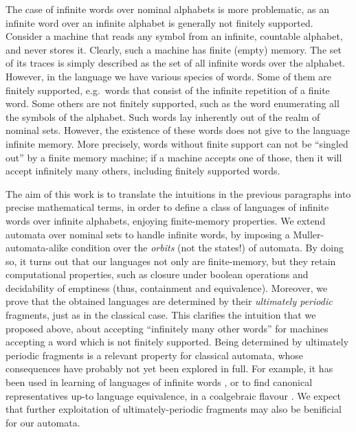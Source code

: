 The case of infinite words over nominal alphabets is more problematic, as an infinite word over an infinite alphabet is generally not finitely supported. Consider a machine that reads any symbol from an infinite, countable alphabet, and never stores it. Clearly, such a machine has finite (empty) memory. The set of its traces is simply described as the set of all infinite words over the alphabet. However, in the language we have various species of words. Some of them are finitely supported, e.g.\ words that consist of the infinite repetition of a finite word. Some others are not finitely supported, such as the word enumerating all the symbols of the alphabet. Such words lay inherently out of the realm of nominal sets. However, the existence of these words does not give to the language infinite memory. More precisely,  words without finite support can not be ``singled out'' by a finite memory machine; if a machine accepts one of those, then it will accept infinitely many others, including finitely supported words.  

The aim of this work is to translate the intuitions in the previous paragraphs into precise mathematical terms, in order to define a class of languages of infinite words over infinite alphabets, enjoying finite-memory properties. We extend automata over nominal sets to handle infinite words, by imposing a Muller-automata-alike condition 
%
%
over the \emph{orbits} (not the states!) of automata. By doing so, it turns out that our languages not only are finite-memory, but they retain computational properties, such as closure under boolean operations and decidability of emptiness (thus, containment and equivalence). Moreover, we prove that the obtained languages are determined by their \emph{ultimately periodic} fragments, just as in the classical case. This clarifies the intuition that we proposed above, about accepting ``infinitely many other words'' for machines accepting a word which is not finitely supported. 
%
Being determined by ultimately periodic fragments is
a relevant property for classical automata, whose consequences  have probably not yet been explored in full.
%
For example, it has been used in learning of languages of infinite words \cite{Emerson}, or to find canonical representatives up-to language equivalence, in a coalgebraic flavour \cite{CV12}. We expect that further exploitation of ultimately-periodic fragments may also be benificial for 
our automata.%



